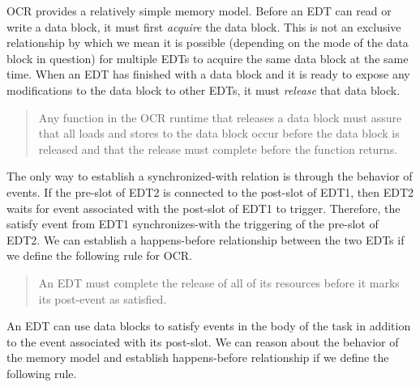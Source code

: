 OCR provides a relatively simple memory model. Before an EDT can read
or write a data block, it must first \emph{acquire} the data
block. This is not an exclusive relationship by which we mean it is
possible (depending on the mode of the data block in question) for
multiple EDTs to acquire the same data block at the same
time.  When an EDT has finished with a data block and it is ready
to expose any modifications to the data block to other EDTs, it
must \emph{release} that data block.

\begin{quote}
Any function in the OCR runtime that releases a data block must assure
that all loads and stores to the data block occur before the data
block is released and that the release must complete before the
function returns.
\end{quote}

The only way to establish a synchronized-with relation is through the
behavior of events. If the pre-slot of EDT2 is connected to the post-slot
of EDT1, then EDT2 waits for event associated with the post-slot of EDT1 to
trigger. Therefore, the satisfy event from EDT1 synchronizes-with the
triggering of the pre-slot of EDT2. We can establish a happens-before
relationship between the two EDTs if we define the following rule for
OCR.

\begin{quote}
An EDT must complete the release of all of its resources before it
marks its post-event as satisfied.
\end{quote}

An EDT can use data blocks to satisfy events in the body of the task
in addition to the event associated with its post-slot. We can reason
about the behavior of the memory model and establish happens-before
relationship if we define the following rule.

%
%
%
%




